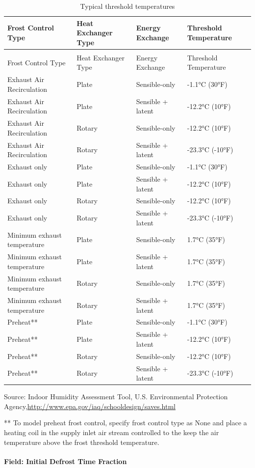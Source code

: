 \begin{longtable}[c]{>{\raggedright}p{1.5in}>{\raggedright}p{1.5in}>{\raggedright}p{1.5in}>{\raggedright}p{1.5in}}
\caption{Typical threshold temperatures \label{table:typical-threshold-temperatures}} \tabularnewline
\toprule
Frost Control Type & Heat Exchanger Type & Energy Exchange & Threshold Temperature \tabularnewline
\midrule
\endfirsthead

\caption[]{Typical threshold temperatures} \tabularnewline
\toprule
Frost Control Type & Heat Exchanger Type & Energy Exchange & Threshold Temperature \tabularnewline
\midrule
\endhead

Exhaust Air Recirculation & Plate & Sensible-only & -1.1°C (30°F) \tabularnewline
Exhaust Air Recirculation & Plate & Sensible + latent & -12.2°C (10°F) \tabularnewline
Exhaust Air Recirculation & Rotary & Sensible-only & -12.2°C (10°F) \tabularnewline
Exhaust Air Recirculation & Rotary & Sensible + latent & -23.3°C (-10°F) \tabularnewline

Exhaust only & Plate & Sensible-only & -1.1°C (30°F) \tabularnewline
Exhaust only & Plate & Sensible + latent & -12.2°C (10°F) \tabularnewline
Exhaust only & Rotary & Sensible-only & -12.2°C (10°F) \tabularnewline
Exhaust only & Rotary & Sensible + latent & -23.3°C (-10°F) \tabularnewline

Minimum exhaust temperature & Plate & Sensible-only & 1.7°C (35°F) \tabularnewline
Minimum exhaust temperature & Plate & Sensible + latent & 1.7°C (35°F) \tabularnewline
Minimum exhaust temperature & Rotary & Sensible-only & 1.7°C (35°F) \tabularnewline
Minimum exhaust temperature & Rotary & Sensible + latent & 1.7°C (35°F) \tabularnewline

Preheat** & Plate & Sensible-only & -1.1°C (30°F) \tabularnewline
Preheat** & Plate & Sensible + latent & -12.2°C (10°F) \tabularnewline
Preheat** & Rotary & Sensible-only & -12.2°C (10°F) \tabularnewline
Preheat** & Rotary & Sensible + latent & -23.3°C (-10°F) \tabularnewline
\bottomrule
\end{longtable}

Source: Indoor Humidity Assessment Tool, U.S. Environmental Protection Agency,\url{http://www.epa.gov/iaq/schooldesign/saves.html}

** To model preheat frost control, specify frost control type as None and place a heating coil in the supply inlet air stream controlled to the keep the air temperature above the frost threshold temperature.

\paragraph{Field: Initial Defrost Time Fraction}\label{field-initial-defrost-time-fraction}


